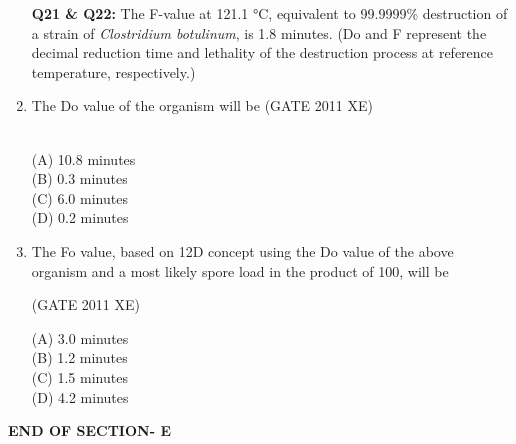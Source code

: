 \documentclass[journal,12pt,onecolumn]{IEEEtran}
\begin{document}
\begin{enumerate}
\item[\textbf{Q21 \& Q22:}] The F-value at 121.1 °C, equivalent to 99.9999\% destruction of a strain of \textit{Clostridium botulinum}, is 1.8 minutes.  
(Do and F represent the decimal reduction time and lethality of the destruction process at reference temperature, respectively.)\\


\item The Do value of the organism will be
\hfill{(GATE 2011 XE)} \\\
\begin{multicols}{2}
(A) 10.8 minutes \\
(B) 0.3 minutes \\
(C) 6.0 minutes \\
(D) 0.2 minutes
\end{multicols}

\item The Fo value, based on 12D concept using the Do value of the above organism and a most likely spore load in the product of 100, will be

\hfill{(GATE 2011 XE)} \\
\begin{multicols}{2}
(A) 3.0 minutes \\
(B) 1.2 minutes \\
(C) 1.5 minutes \\
(D) 4.2 minutes
\end{multicols}

\end{enumerate}

\vspace{3\baselineskip}
    \begin{center}
    \textbf{\Large END OF SECTION- E}
    \end{center}
\end{document}
